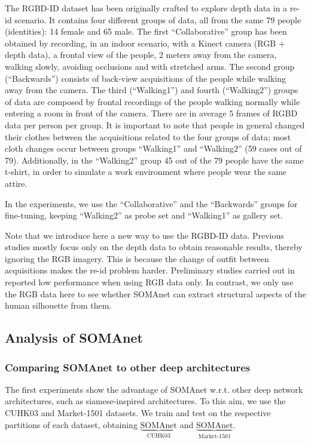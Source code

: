 \documentclass[10pt,journal,letterpaper,compsoc]{IEEEtran}
\newcommand{\ts}[2]{$\underbrace{\text{#1}}_\text{#2}$}
\begin{document}
The RGBD-ID dataset has been originally crafted to explore depth data in a re-id scenario. It contains four different groups of data, all from the same 79 people (identities): 14 female and 65 male. The  first ``Collaborative'' group has been obtained by recording, in an indoor scenario, with a Kinect camera (RGB + depth data), a frontal view of the people, 2 meters away from the camera, walking slowly, avoiding occlusions and with stretched arms. The second group (``Backwards'') consists of back-view acquisitions of the people while walking away from the camera. The third (``Walking1'') and fourth (``Walking2'') groups of data are composed by frontal recordings of the people walking normally while entering a room in front of the camera. There are in average 5 frames of RGBD data per person per group. It is important to note that people in general changed their clothes between the acquisitions related to the four groups of data; most cloth changes occur between groups ``Walking1'' and ``Walking2'' (59 cases out of 79). Additionally, in the ``Walking2'' group 45 out of the 79 people have the same t-shirt, in order to simulate a work environment where people wear the same attire.

In the experiments, we use the ``Collaborative'' and the ``Backwards'' groups for fine-tuning, keeping ``Walking2'' as probe set and ``Walking1'' as gallery set.

Note that we introduce here a new way to use the RGBD-ID data. Previous studies mostly focus only on the depth data to obtain reasonable results, thereby ignoring the RGB imagery. This is because the change of outfit between acquisitions makes the re-id problem harder. Preliminary studies carried out in~\cite{barbosa2012re} reported low performance when using RGB data only. In contrast, we only use the RGB data here to see whether SOMAnet can extract structural aspects of the human silhouette from them.


\subsection{Analysis of SOMAnet}\label{Sec:SOMAnetEvaluation}

\subsubsection{Comparing SOMAnet to other deep architectures}\label{Sec:vsDeep}

The first experiments show the advantage of SOMAnet w.r.t. other deep network architectures, such as siamese-inspired architectures. To this aim, we use the CUHK03 and Market-1501 datasets. We train and test on the respective partitions of each dataset, obtaining \ts{SOMAnet}{CUHK03} and \ts{SOMAnet}{Market-1501}.
\end{document}
